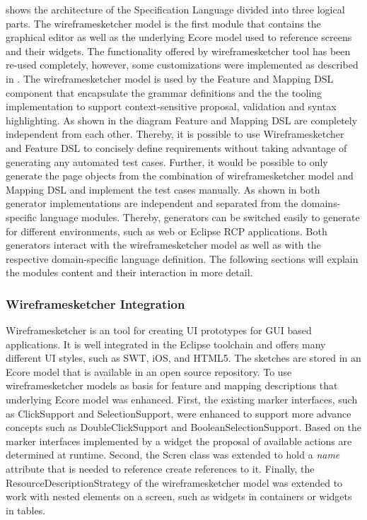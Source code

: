 \documentclass{sig-alternate-05-2015}
\begin{document}
 shows the architecture of the Specification Language divided into three logical parts. 
The wireframesketcher model is the first module that contains the graphical editor as well as the underlying Ecore model used to reference screens and their widgets.
The functionality offered by wireframesketcher tool has been re-used completely, however, some customizations were implemented as described in .
The wireframesketcher model is used by the Feature and Mapping DSL component that encapsulate the grammar definitions and the the tooling implementation to support context-sensitive proposal, validation and syntax highlighting.
As shown in the diagram Feature and Mapping DSL are completely independent from each other.
Thereby, it is possible to use Wireframesketcher and Feature DSL to concisely define requirements without taking advantage of generating any automated test cases.
Further, it would be possible to only generate the page objects from the combination of wireframesketcher model and Mapping DSL and implement the test cases manually.
As shown in  both generator implementations are independent and separated from the domains-specific language modules.
Thereby, generators can be switched easily to generate for different environments, such as web or Eclipse RCP applications.
Both generators interact with the wireframesketcher model as well as with the respective domain-specific language definition.
The following sections will explain the modules content and their interaction in more detail.

\subsubsection{Wireframesketcher Integration}\label{sec:WireframesketcherIntegration} 
Wireframesketcher is an tool for creating UI prototypes for GUI based applications. 
It is well integrated in the Eclipse toolchain and offers many different UI styles, such as SWT, iOS, and HTML5.
The sketches are stored in an Ecore model that is available in an open source repository.
To use wireframesketcher models as basis for feature and mapping descriptions that underlying Ecore model was enhanced.
First, the existing marker interfaces, such as ClickSupport and SelectionSupport, were enhanced to support more advance concepts such as DoubleClickSupport and BooleanSelectionSupport.
Based on the marker interfaces implemented by a widget the proposal of available actions are determined at runtime.
Second, the Scren class was extended to hold a \textit{name} attribute that is needed to reference create references to it.
Finally, the ResourceDescriptionStrategy of the wireframesketcher model was extended to work with nested elements on a screen, such as widgets in containers or widgets in tables.
\end{document}
